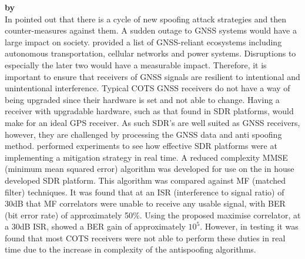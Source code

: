 \medskip

\textbf{\emph{} by \citeauthor{RN18}} \\
In  \citeauthor{RN18} \cite{RN18} pointed out that there is a cycle of new spoofing attack strategies and then counter-measures
against them. A sudden outage to GNSS systems would have a large impact on society. \citeauthor{RN18} provided a list of GNSS-reliant ecosystems including
autonomous transportation, cellular networks and power systems. Disruptions to especially the later two would have a measurable impact. Therefore, it is
important to ensure that receivers of GNSS signals are resilient to intentional and unintentional interference.
Typical COTS GNSS receivers do not have a way of being upgraded since their hardware is set and not able to change. Having a receiver
with upgradable hardware, such as that found in SDR platforms, would make for an ideal GPS receiver. As such SDR's are well suited as GNSS receivers,
however, they are challenged by processing the GNSS data and anti spoofing method. \citeauthor{RN18} performed experiments to see how effective SDR 
platforms were at implementing a mitigation strategy in real time. A reduced complexity MMSE (minimum mean squared error) algorithm was developed for
use on the in house developed SDR platform. This algorithm was compared against MF (matched filter) techniques. It was found that at an ISR (interference to signal ratio)
of 30dB that MF correlators were unable to receive any usable signal, with BER (bit error rate) of approximately 50\%. Using the proposed maximise
correlator, at a 30dB ISR, showed a BER gain of approximately $10^5$. 
However, in testing it was found that most COTS receivers were not able to perform these duties in real time due to the increase in complexity of the antispoofing algorithms.

\medskip

